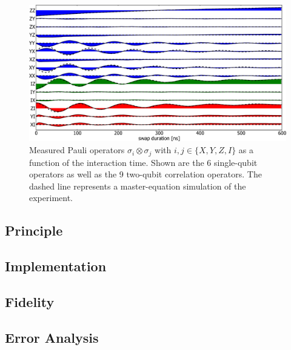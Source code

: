 \begin{figure}
   \centering
	 \includegraphics[width=1.\textwidth]{"./data/ct5/film of swap/pauli_set_vs_time_with_simulation"}
	 \caption[test]{Measured Pauli operators $\sigma_i \otimes \sigma_j$ with $i,j \in \{X,Y,Z,I\}$ as a function of the interaction time. Shown are the 6 single-qubit operators as well as the 9 two-qubit correlation operators. The dashed line represents a master-equation simulation of the experiment.}
	 \label{fig:swap_pauli_set_vs_time_with_simulation}
\end{figure}

\subsection{Principle}

\subsection{Implementation}

\subsection{Fidelity}

\subsection{Error Analysis}


